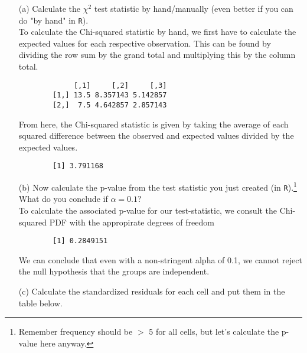 \documentclass[12pt,letterpaper]{article}
\begin{document}
\begin{enumerate}
	
	\item [(a)]
	Calculate the $\chi^2$ test statistic by hand/manually (even better if you can do "by hand" in \texttt{R}).\\

	To calculate the Chi-squared statistic by hand, we first have to calculate the expected values for each respective observation. This can be found by dividing the row sum by the grand total and multiplying this by the column total.
	  
	\begin{verbatim}
		     [,1]     [,2]     [,3]
		[1,] 13.5 8.357143 5.142857
		[2,]  7.5 4.642857 2.857143
	\end{verbatim}
	
	From here, the Chi-squared statistic is given by taking the average of each squared difference between the observed and expected values divided by the expected values.
	
	  
	\begin{verbatim}
		[1] 3.791168
	\end{verbatim}
	
		
	\vspace{2cm}
	\item [(b)]
	Now calculate the p-value from the test statistic you just created (in \texttt{R}).\footnote{Remember frequency should be $>$ 5 for all cells, but let's calculate the p-value here anyway.}  What do you conclude if $\alpha = 0.1$?\\
	
	To calculate the associated p-value for our test-statistic, we consult the Chi-squared PDF with the appropirate degrees of freedom
	
	  
	\begin{verbatim}
		[1] 0.2849151
	\end{verbatim}
	
	We can conclude that even with a non-stringent alpha of 0.1, we cannot reject the null hypothesis that the groups are independent.
	
	\newpage
	\item [(c)] Calculate the standardized residuals for each cell and put them in the table below.
	\vspace{1cm}
	

\end{enumerate}
\end{document}
